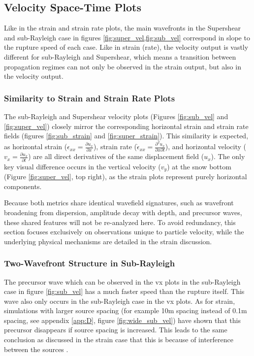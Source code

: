 \subsection{Velocity Space-Time Plots}
\label{sec:vel_disc}
Like in the strain and strain rate plots, the main wavefronts in the Supershear and sub-Rayleigh case in figures \ref{fig:super_vel,fig:sub_vel} correspond in slope to the rupture speed of each case. Like in strain (rate), the velocity output is vastly different for sub-Rayleigh and Supershear, which means a transition between propagation regimes can not only be observed in the strain output, but also in the velocity output. \par

\subsubsection{Similarity to Strain and Strain Rate Plots}
The sub-Rayleigh and Supershear velocity plots (Figures \ref{fig:sub_vel} and \ref{fig:super_vel}) closely mirror the corresponding horizontal strain and strain rate fields (figures \ref{fig:sub_strain} and \ref{fig:super_strain}). This similarity is expected, as horizontal strain ($\epsilon_{xx} = \frac{\partial u_x}{\partial x}$), strain rate ($\dot{\epsilon}_{xx} = \frac{\partial^2 u_x}{\partial x \partial t}$), and horizontal velocity ($v_x = \frac{\partial u_x}{\partial t}$) are all direct derivatives of the same displacement field ($u_x$). The only key visual difference occurs in the vertical velocity ($v_y$) at the snow bottom (Figure \ref{fig:super_vel}, top right), as the strain plots represent purely horizontal components. 

Because both metrics share identical wavefield signatures, such as wavefront broadening from dispersion, amplitude decay with depth, and precursor waves, these shared features will not be re-analyzed here. To avoid redundancy, this section focuses exclusively on observations unique to particle velocity, while the underlying physical mechanisms are detailed in the strain discussion. \par

\subsubsection{Two-Wavefront Structure in Sub-Rayleigh}
\label{sec:disc_sub_two_waves}

The precursor wave which can be observed in the vx plots in the sub-Rayleigh case in figure \ref{fig:sub_vel} has a much faster speed than the rupture itself. This wave also only occurs in the sub-Rayleigh case in the vx plots. As for strain, simulations with larger source spacing (for example 10m spacing instead of 0.1m spacing, see appendix \ref{app:D}, figure \ref{fig:wide_sub_vel}) have shown that this precursor disappears if source spacing is increased. This leads to the same conclusion as discussed in the strain case that this is because of interference between the sources \parencite{madariagaDynamicsExpandingCircular1976}. \par

